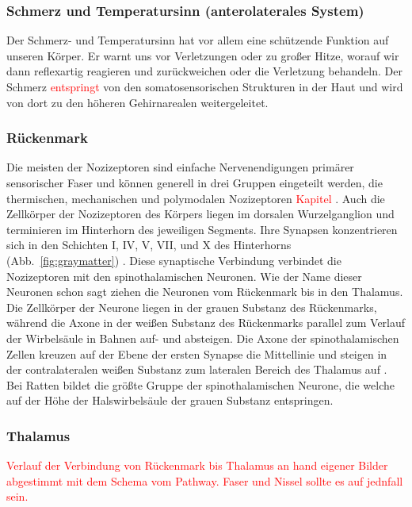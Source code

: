 \documentclass[12pt,a4paper,pdftex]{article}
\begin{document}
\newpage    
\subsubsection{Schmerz und Temperatursinn (anterolaterales System)}
Der Schmerz- und Temperatursinn hat vor allem eine schützende Funktion auf unseren Körper. Er warnt uns vor Verletzungen oder zu großer Hitze, worauf wir dann reflexartig reagieren und zurückweichen oder die Verletzung behandeln. Der Schmerz \textcolor{red}{entspringt} von den somatosensorischen Strukturen in der Haut und wird von dort zu den höheren Gehirnarealen weitergeleitet. 

\subsubsection*{Rückenmark}
Die meisten der Nozizeptoren sind einfache Nervenendigungen primärer sensorischer Faser und können generell in drei Gruppen eingeteilt werden, die thermischen, mechanischen und polymodalen Nozizeptoren \textcolor{red}{Kapitel} \citep{kandel2013principles}. Auch die Zellkörper der Nozizeptoren des Körpers liegen im dorsalen Wurzelganglion und terminieren im Hinterhorn des jeweiligen Segments.  Ihre Synapsen konzentrieren sich in den Schichten I, IV, V, VII, und X des Hinterhorns (Abb.~\ref{fig:graymatter}) \cite[Kap.~25]{paxinos2014rat}.
Diese synaptische Verbindung verbindet die Nozizeptoren mit den spinothalamischen Neuronen. Wie der Name dieser Neuronen schon sagt ziehen die Neuronen vom Rückenmark bis in den Thalamus. Die Zellkörper der Neurone liegen in der grauen Substanz des Rückenmarks, während die Axone in der weißen Substanz des Rückenmarks parallel zum Verlauf der Wirbelsäule in Bahnen auf- und absteigen. Die Axone der spinothalamischen Zellen kreuzen auf der Ebene der ersten Synapse die Mittellinie und steigen in der contralateralen weißen Substanz zum lateralen Bereich des Thalamus auf \cite[Kap.~25]{paxinos2014rat}. Bei Ratten bildet die größte Gruppe der spinothalamischen Neurone, die welche auf der Höhe der Halswirbelsäule der grauen Substanz entspringen.

\subsubsection*{Thalamus}
\textcolor{red}{Verlauf der Verbindung von Rückenmark bis Thalamus an hand eigener Bilder abgestimmt mit dem Schema vom Pathway. Faser und Nissel sollte es auf jednfall sein.}
    
\end{document}
